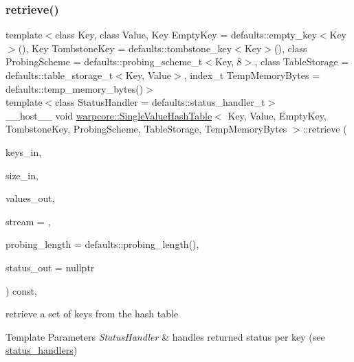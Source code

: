 \subsubsection{\texorpdfstring{retrieve()}{retrieve()}\hspace{0.1cm}{\footnotesize\ttfamily [2/3]}}
{\footnotesize\ttfamily template$<$class Key, class Value, Key Empty\+Key = defaults\+::empty\+\_\+key$<$\+Key$>$(), Key Tombstone\+Key = defaults\+::tombstone\+\_\+key$<$\+Key$>$(), class Probing\+Scheme = defaults\+::probing\+\_\+scheme\+\_\+t$<$\+Key, 8$>$, class Table\+Storage = defaults\+::table\+\_\+storage\+\_\+t$<$\+Key, Value$>$, index\+\_\+t Temp\+Memory\+Bytes = defaults\+::temp\+\_\+memory\+\_\+bytes()$>$ \\
template$<$class Status\+Handler  = defaults\+::status\+\_\+handler\+\_\+t$>$ \\
\+\_\+\+\_\+host\+\_\+\+\_\+ void \hyperlink{classwarpcore_1_1SingleValueHashTable}{warpcore\+::\+Single\+Value\+Hash\+Table}$<$ Key, Value, Empty\+Key, Tombstone\+Key, Probing\+Scheme, Table\+Storage, Temp\+Memory\+Bytes $>$\+::retrieve (\begin{DoxyParamCaption}\item[{key\+\_\+type $\ast$}]{keys\+\_\+in,  }\item[{index\+\_\+type}]{size\+\_\+in,  }\item[{value\+\_\+type $\ast$}]{values\+\_\+out,  }\item[{cuda\+Stream\+\_\+t}]{stream = {},  }\item[{index\+\_\+type}]{probing\+\_\+length = {\ttfamily defaults\+:\+:probing\+\_\+length()},  }\item[{typename Status\+Handler\+::base\+\_\+type $\ast$}]{status\+\_\+out = {\ttfamily nullptr} }\end{DoxyParamCaption}) const\hspace{0.3cm}{\ttfamily [inline]}, {\ttfamily [noexcept]}}



retrieve a set of keys from the hash table 


\begin{DoxyTemplParams}{Template Parameters}
{\em Status\+Handler} & handles returned status per key (see {\ttfamily \hyperlink{namespacewarpcore_1_1status__handlers}{status\+\_\+handlers}}) \\
\hline
\end{DoxyTemplParams}

